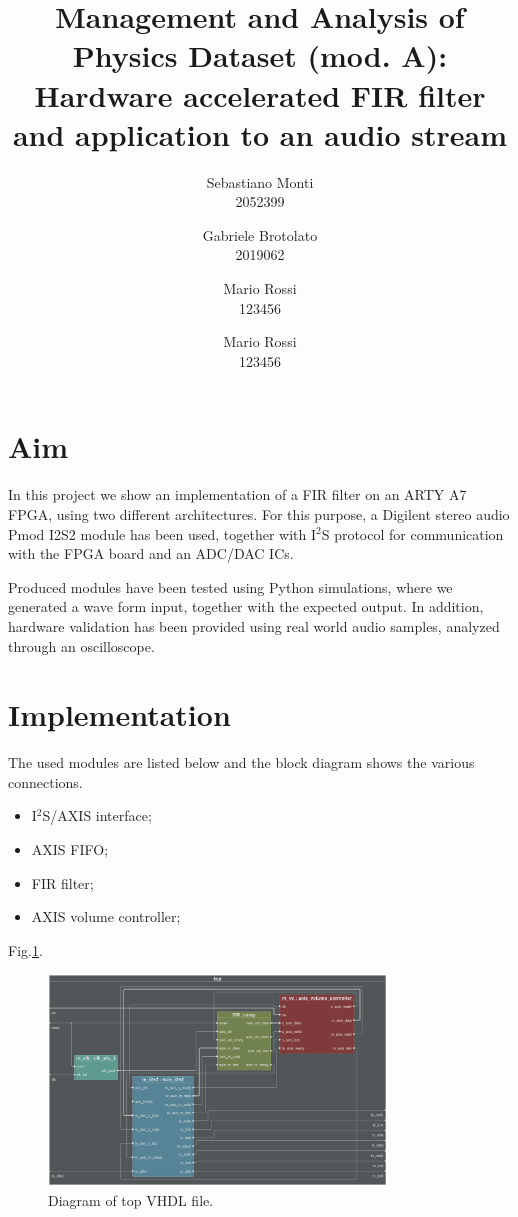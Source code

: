 \documentclass[11pt, a4paper]{article}
\begin{document}
\author{Sebastiano Monti\\2052399  \and Gabriele Brotolato\\2019062 \and Mario Rossi\\123456 \and Mario Rossi\\123456}
\title{\textbf{Management and Analysis of Physics Dataset (mod. A): \\ Hardware accelerated FIR filter and application to an audio stream}}
\maketitle

\section{Aim}
In this project we show an implementation of a FIR filter on an ARTY A7 FPGA, using two different architectures. For this purpose, a Digilent stereo audio Pmod I2S2 module has been used, together with I$^2$S protocol for communication with the FPGA board and an ADC/DAC ICs. 

Produced modules have been tested using Python simulations, where we generated a wave form input, together with the expected output. In addition, hardware validation has been provided using real world audio samples, analyzed through an oscilloscope.





\section{Implementation}
The used modules are listed below and the block diagram shows the various connections.
\begin{itemize}
    \item I$^2$S/AXIS interface;
    \item AXIS FIFO;
    \item FIR filter;
    \item AXIS volume controller;
    
\end{itemize}

Fig.\ref{fig:Block_diagram}.

\vspace{1cm}
\begin{figure}[h!]
    \centering
    \includegraphics[width=0.8\textwidth]{images/BD_gr_cfg.png}
    \caption{\label{fig:Block_diagram} Diagram of top VHDL file.}
\end{figure}
\vspace{1cm}
\end{document}
